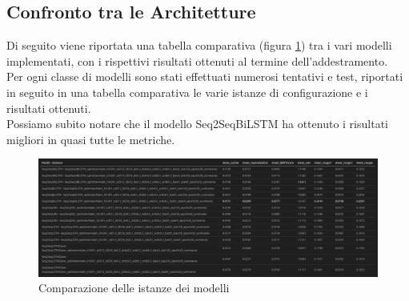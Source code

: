 \subsection{Confronto tra le Architetture}
Di seguito viene riportata una tabella comparativa (figura \ref{fig:models_comparison_instances}) tra i vari modelli implementati, con i rispettivi risultati ottenuti al termine dell'addestramento.\\
Per ogni classe di modelli sono stati effettuati numerosi tentativi e test, riportati in seguito in una tabella comparativa le varie istanze di configurazione e i risultati ottenuti.\\
Possiamo subito notare che il modello Seq2SeqBiLSTM ha ottenuto i risultati migliori in quasi tutte le metriche.
\begin{figure}[H]
    \centering
    \includegraphics[width=1\textwidth]{media/models_comparison_instances.png}
    \caption{Comparazione delle istanze dei modelli}
    \label{fig:models_comparison_instances}
\end{figure}
  
